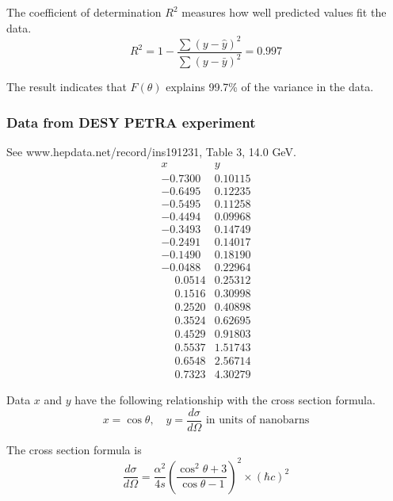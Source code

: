 The coefficient of determination $R^2$ measures how well predicted values fit the data.
\begin{equation*}
R^2=1-\frac{\sum(y-\hat y)^2}{\sum(y-\bar y)^2}=0.997
\end{equation*}

The result indicates that $F(\theta)$ explains
99.7\% of the variance in the data.

\subsubsection*{Data from DESY PETRA experiment}

See www.hepdata.net/record/ins191231, Table 3, 14.0 GeV.
\begin{equation*}
\begin{matrix}
x & y\\
-0.7300 & 0.10115\\
-0.6495 & 0.12235\\
-0.5495 & 0.11258\\
-0.4494 & 0.09968\\
-0.3493 & 0.14749\\
-0.2491 & 0.14017\\
-0.1490 & 0.18190\\
-0.0488 & 0.22964\\
\phantom+0.0514 & 0.25312\\
\phantom+0.1516 & 0.30998\\
\phantom+0.2520 & 0.40898\\
\phantom+0.3524 & 0.62695\\
\phantom+0.4529 & 0.91803\\
\phantom+0.5537 & 1.51743\\
\phantom+0.6548 & 2.56714\\
\phantom+0.7323 & 4.30279
\end{matrix}
\end{equation*}

Data $x$ and $y$ have the following relationship with the cross section formula.
\begin{equation*}
x=\cos\theta,
\quad
y=\frac{d\sigma}{d\Omega}\text{ in units of nanobarns}
\end{equation*}

The cross section formula is
\begin{equation*}
\frac{d\sigma}{d\Omega}
=\frac{\alpha^2}{4s}
\left(\frac{\cos^2\theta+3}{\cos\theta-1}\right)^2\times(\hbar c)^2
\end{equation*}

